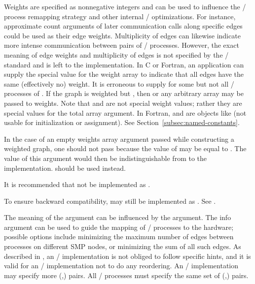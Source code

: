 Weights are specified as nonnegative integers and can be used to
influence the \MPI/ process remapping strategy and other internal \MPI/
optimizations. For instance, approximate count arguments of later
communication calls along specific edges could be used as their edge
weights. Multiplicity of edges can likewise indicate more intense
communication between pairs of \MPI/ processes. However, the exact meaning
of edge weights and multiplicity of edges is not specified by the \MPI/ standard and is left to
the implementation. In C or Fortran, an application can supply the
special value  for the weight array to indicate
that all edges have the same (effectively no) weight. It is erroneous to supply  for some but not all \MPI/ processes of
. 
If the graph is weighted but , then
 or any arbitrary array may be passed to
weights. Note that  and
 are not special weight values; rather
they are special values for the total array argument. In Fortran,
 and  are objects like
 (not usable for initialization or assignment).
See Section~\ref{subsec:named-constants}. %

\begin{users}
In the case of an empty weights array argument passed while constructing
a weighted graph, one should not pass  because the value of
 may be equal to . The value of this argument
would then be indistinguishable from  to the
implementation.  should be used
instead.
\end{users}

\begin{implementors}
It is recommended that  not be implemented as
.
\end{implementors}

\begin{rationale}
To ensure backward compatibility,  may still be
implemented as . See .
\end{rationale}

The meaning of the  argument can be influenced by the
 argument. The info argument can be used to guide the
mapping of \MPI/ processes to the hardware; possible options include minimizing the maximum number of
edges between processes on different SMP nodes, or minimizing the sum
of all such edges.  As described in , 
an \MPI/ implementation is not obliged to follow
specific hints, and it is valid for an \MPI/ implementation not to do
any reordering.  An \MPI/ implementation may specify more 
(,) pairs. All \MPI/ processes must specify the same set of (,)
 pairs.

